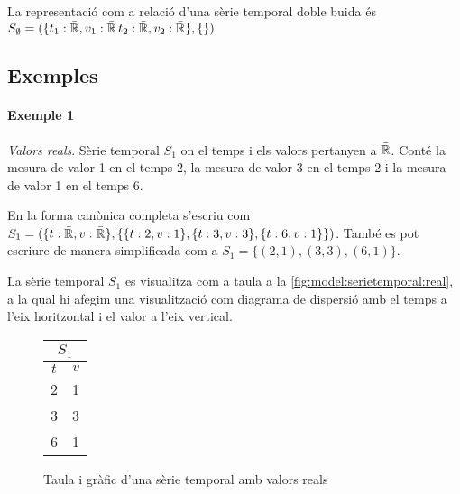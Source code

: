 \begin{definition}
  La representació com a relació d'una sèrie temporal doble buida és
  $S_{\emptyset} = ( \{t_1: \bar{\mathbb{R}{}}, v_1: \bar{\mathbb{R}{}}\,
  t_2: \bar{\mathbb{R}{}}, v_2: \bar{\mathbb{R}{}}\}, \{ \} )$
\end{definition}




\subsection{Exemples}





\paragraph{Exemple 1} \emph{Valors reals}.  Sèrie temporal $S_1$ on el
temps i els valors pertanyen a $\bar{\mathbb{R}{}}$. Conté la mesura de
valor 1 en el temps 2, la mesura de valor 3 en el temps 2 i la mesura
de valor 1 en el temps 6. 

En la forma canònica completa s'escriu com $S_1 = ( \{t:
\bar{\mathbb{R}{}}, v: \bar{\mathbb{R}{}}\}, \{ \{t:2,v:1\}, \{t:3,v:3\},
\{t:6,v:1\} \} )$. També es pot escriure de manera simplificada com a
$S_1 = \{ (2,1), (3,3), (6,1) \}$.


La sèrie temporal $S_1$ es visualitza com a taula a la
\autoref{fig:model:serietemporal:real}, a la qual hi afegim una
visualització com diagrama de dispersió amb el temps a l'eix
horitzontal i el valor a l'eix vertical.

\begin{figure}[tp]
  \centering
  \begin{tabular}[c]{|c|c|}
    \multicolumn{2}{c}{$S_1$} \\ \hline
    $t$  & $v$ \\ \hline
    2  & 1 \\
    3  & 3 \\
    6  & 1 \\ \hline
  \end{tabular} \qquad
  \caption{Taula i gràfic d'una sèrie temporal amb valors reals}
  \label{fig:model:serietemporal:real}
\end{figure}


